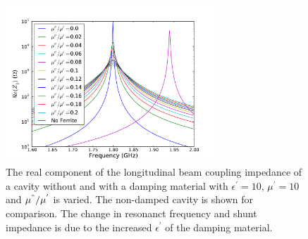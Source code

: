 \begin{figure}
\begin{center}
\includegraphics[width=0.7\textwidth]{Beam_Coupling_Impedance_Reduction_Techniques/figures/no_screen_long_imp_all.pdf}
\end{center}
\caption{The real component of the longitudinal beam coupling impedance of a cavity without and with a damping material with $\epsilon^{'}=10$, $\mu^{'}=10$ and $\mu^{"}/\mu^{'}$ is varied. The non-damped cavity is shown for comparison. The change in resonanct frequency and shunt impedance is due to the increased $\epsilon^{'}$ of the damping material.}
\label{fig:no_screen_long_imp}
\end{figure}

